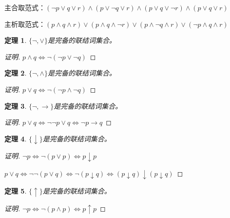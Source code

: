 \documentclass{article}
\newtheorem{Thm}{定理}
\begin{document}
\begin{CJK*}{UTF8}{gbsn}
主合取范式：$(\lnot p\lor q\lor r)\land (p\lor \lnot q\lor r)\land (p\lor q\lor \lnot r) \land (p\lor q\lor r)$

主析取范式：$(p\land q\land r)\lor (p\land q\land \lnot r)\lor (p\land \lnot q\land r) \lor (\lnot p\land q\land r)$


  \begin{Thm}
    $\{\lnot, \lor\}$是完备的联结词集合。
  \end{Thm}
  \begin{proof}[证明]
    $p\land q\Leftrightarrow \lnot (\lnot p\lor \lnot q)$
  \end{proof}
  \begin{Thm}
    $\{\lnot, \land\}$是完备的联结词集合。
  \end{Thm}
  \begin{proof}[证明]
    $p\lor q\Leftrightarrow \lnot (\lnot p\land \lnot q)$
  \end{proof}
  \begin{Thm}
    $\{\lnot, \to\}$是完备的联结词集合。
  \end{Thm}
  \begin{proof}[证明]
    $p\lor q\Leftrightarrow \lnot \lnot p \lor q \Leftrightarrow \lnot p \to q$
  \end{proof}
  \begin{Thm}
    $\{\downarrow\}$是完备的联结词集合。
  \end{Thm}
  \begin{proof}[证明]
    $\lnot p \Leftrightarrow \lnot (p\lor p) \Leftrightarrow p \downarrow p$

    $p\lor q \Leftrightarrow \lnot \lnot (p\lor q) \Leftrightarrow \lnot (p\downarrow q) \Leftrightarrow (p\downarrow q)\downarrow (p\downarrow q)$
  \end{proof}
  \begin{Thm}
    $\{\uparrow\}$是完备的联结词集合。
  \end{Thm}
  \begin{proof}[证明]
    $\lnot p \Leftrightarrow \lnot (p\land p) \Leftrightarrow p \uparrow p$


\end{proof}
\end{CJK*}
\end{document}
